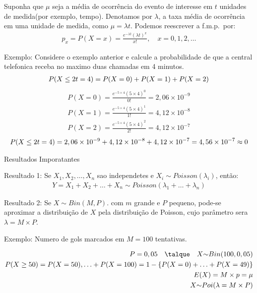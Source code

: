 \documentclass[11pt,a4paper]{book}
\begin{document}
     Suponha que $\mu$ seja a média de ocorrência do evento de interesse
     em $t$ unidades de medida(por exemplo, tempo). Denotamos por $\lambda$,
     a taxa média de ocorrência em uma unidade de medida, como $\mu= \lambda t$.
     Podemos reescrever a f.m.p.\ por:
     \begin{align*}
       p_{x} =P(X=x)= \frac{e^{-\lambda t} \left( \lambda t \right)^{x}}{x!}, \quad x=0,1,2,\ldots
     \end{align*}
     \begin{description} 
       \item{Exemplo}: Considere o exemplo anterior e calcule a probabilidade de que a central 
         telefonica receba no maximo duas chamadas em 4 minutos.
         \begin{align*}
           P(X \leq 2 \/ t=4) = P(X=0)+P(X=1)+P(X=2)
         \end{align*}
     \begin{align*}
       P(X=0) = \frac{e^{-5 \times 4}(5\times 4)^0}{0!}= 2,06 \times 10^{-9}\\
       P(X=1) = \frac{e^{-5 \times 4}(5\times 4)^1}{1!}= 4,12 \times 10^{-8}\\
       P(X=2) = \frac{e^{-5 \times 4}(5\times 4)^2}{2!}= 4,12 \times 10^{-7} 
     \end{align*}
    \begin{align*}
      P(X \leq 2 \/ t=4)= 2,06 \times 10^{-9}+4,12 \times 10^{-8}+4,12 \times 10^{-7} = 4,56 \times 10^{-7} \approx 0
    \end{align*} 
  \item{Resultados Imporatantes}
    \begin{description}
  \item {Resultado 1}: Se $X_1, X_2,\ldots, X_n$ sao independetes e $X_i \mathtt{\sim} Poisson(\lambda_i)$, então:
    \begin{align}
      Y= X_1+X_2+\ldots+X_n \mathtt{\sim} Poisson\left( \lambda_1+\ldots+\lambda_n \right)
    \end{align}
  \item {Resultado 2}: Se $X \mathtt{\sim}Bin(M,P)$. com $m$ grande e $P$ pequeno, pode-se aproximar a distribuição de 
    $X$ pela distribuição de Poisson, cujo parâmetro sera $\lambda = M \times P$.
    \begin{description}
      \item {Exemplo}: Numero de gols marcados em $M=100$ tentativas.

    \begin{align*}
      P=0,05 \quad \talque \quad  X \mathtt{\sim} Bin(100, 0,05) \\
      P(X \ge 50)=P(X=50), \ldots + P(X=100)= 1- \{P(X=0)+\ldots+P(X=49) \}\\
      E(X)=M \times p = \mu\\
      X \mathtt{\sim}Poi(\lambda= M \times P)
    \end{align*}


\end{description}
\end{description}
\end{description}
\end{document}
